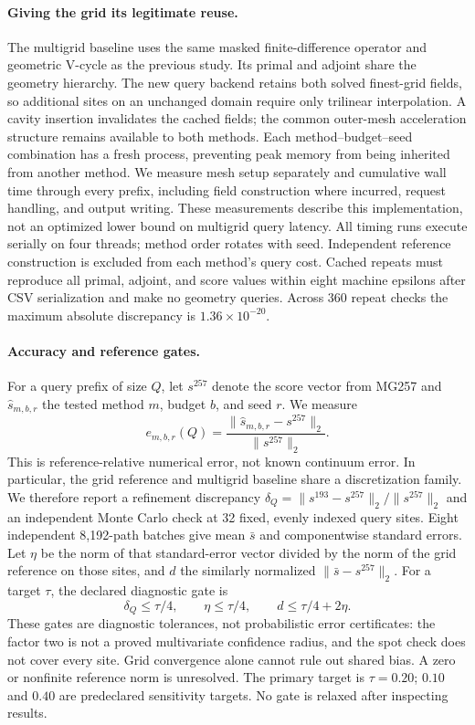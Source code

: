 \paragraph{Giving the grid its legitimate reuse.}
The multigrid baseline uses the same masked finite-difference operator and
geometric V-cycle as the previous study. Its primal and adjoint share the
geometry hierarchy. The new query backend retains both solved finest-grid
fields, so additional sites on an unchanged domain require only trilinear
interpolation. A cavity insertion invalidates the cached fields; the common
outer-mesh acceleration structure remains available to both methods.
Each method--budget--seed combination has a fresh process, preventing peak
memory from being inherited from another method. We measure mesh setup
separately and cumulative wall time through every prefix, including field
construction where incurred, request handling, and output writing. These
measurements describe this implementation, not an optimized lower bound on
multigrid query latency. All timing runs execute serially on four threads;
method order rotates with seed. Independent reference construction is
excluded from each method's query cost. Cached repeats must reproduce all
primal, adjoint, and score values within eight machine epsilons after CSV
serialization and make no geometry queries. Across 360 repeat checks the
maximum absolute discrepancy is $1.36\times10^{-20}$.

\paragraph{Accuracy and reference gates.}
For a query prefix of size $Q$, let $s^{257}$ denote the score vector from
MG257 and $\widehat s_{m,b,r}$ the tested method $m$, budget $b$, and seed $r$.
We measure
\[
 e_{m,b,r}(Q)=\frac{\|\widehat s_{m,b,r}-s^{257}\|_2}{\|s^{257}\|_2}.
\]
This is reference-relative numerical error, not known continuum error.
In particular, the grid reference and multigrid baseline share a
 discretization family. We therefore report a refinement discrepancy
$\delta_Q=\|s^{193}-s^{257}\|_2/\|s^{257}\|_2$ and an independent
Monte Carlo check at 32 fixed, evenly indexed query sites. Eight independent
8,192-path batches give mean $\bar s$ and componentwise standard errors.
Let $\eta$ be the norm of that standard-error vector divided by the norm of
the grid reference on those sites, and $d$ the similarly normalized
$\|\bar s-s^{257}\|_2$. For a target $\tau$, the declared diagnostic gate is
\[
 \delta_Q\leq\tau/4,\qquad \eta\leq\tau/4,\qquad
 d\leq\tau/4+2\eta.
\]
These gates are diagnostic tolerances, not probabilistic error certificates:
the factor two is not a proved multivariate confidence radius, and the
spot check does not cover every site. Grid convergence alone cannot rule out
shared bias. A zero or nonfinite reference norm is unresolved. The primary
target is $\tau=0.20$; $0.10$ and $0.40$ are predeclared sensitivity targets.
No gate is relaxed after inspecting results.

